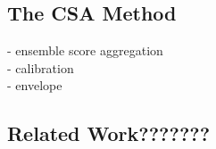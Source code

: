 \subsection{The CSA Method}
\noindent - ensemble score aggregation\\
- calibration\\
- envelope



\subsection{Related Work???????}